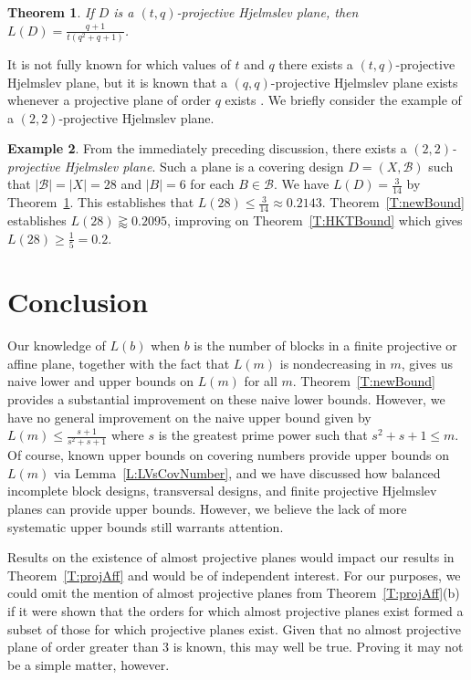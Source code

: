 \documentclass[11pt]{article}
\newtheorem{Theorem}{Theorem}[section]
\theoremstyle{definition}
\newtheorem{Example}[Theorem]{Example}
\renewcommand{\leq}{\leqslant}
\renewcommand{\geq}{\geqslant}
\newcommand{\B}{{\ensuremath{\mathcal{B}}}}
\begin{document}
\begin{Theorem} \label{T:Hjelmslev}
If $D$ is a $(t,q)$-projective Hjelmslev plane, then $L(D) = \frac{q+1}{t(q^2+q+1)}$.
\end{Theorem}

It is not fully known for which values of $t$ and $q$ there exists a $(t,q)$-projective Hjelmslev plane, but it is known that a $(q,q)$-projective Hjelmslev plane exists whenever a projective plane of order $q$ exists \cite{HalRao,HanVan}. We briefly consider the example of a $(2,2)$-projective Hjelmslev plane.

\begin{Example}
From the immediately preceding discussion, there exists a \emph{$(2,2)$-projective Hjelmslev plane}. Such a plane is a covering design $D=(X,\B)$ such that $|\B|=|X|=28$ and $|B|=6$ for each $B \in \B$. We have $L(D) = \frac{3}{14}$ by Theorem~\ref{T:Hjelmslev}. This establishes that $L(28) \leq \frac{3}{14} \approx 0.2143$. Theorem~\ref{T:newBound} establishes $L(28) \gtrapprox 0.2095$, improving on Theorem~\ref{T:HKTBound} which gives $L(28) \geq \frac{1}{5}= 0.2$.
\end{Example}


\section{Conclusion}\label{S:conc}

Our knowledge of $L(b)$ when $b$ is the number of blocks in a finite projective or affine plane, together with the fact that $L(m)$ is nondecreasing in $m$, gives us naive lower and upper bounds on $L(m)$ for all $m$. Theorem~\ref{T:newBound} provides a substantial improvement on these naive lower bounds. However, we have no general improvement on the naive upper bound given by $L(m) \leq \frac{s+1}{s^2+s+1}$ where $s$ is the greatest prime power such that $s^2+s+1 \leq m$. Of course, known upper bounds on covering numbers provide upper bounds on $L(m)$ via Lemma~\ref{L:LVsCovNumber}, and we have discussed how balanced incomplete block designs, transversal designs, and finite projective Hjelmslev planes can provide upper bounds. However, we believe the lack of more systematic upper bounds still warrants attention.

Results on the existence of almost projective planes would impact our results in Theorem~\ref{T:projAff} and would be of independent interest. For our purposes, we could omit the mention of almost projective planes from Theorem~\ref{T:projAff}(b) if it were shown that the orders for which almost projective planes exist formed a subset of those for which projective planes exist. Given that no almost projective plane of order greater than 3 is known, this may well be true. Proving it may not be a simple matter, however.
\end{document}
